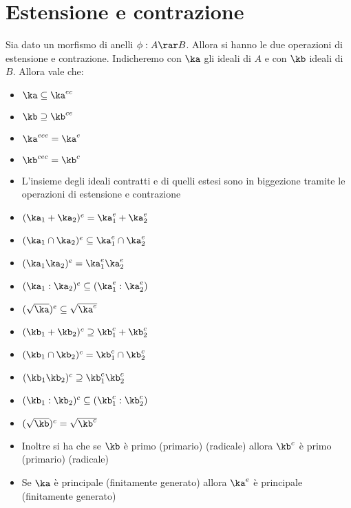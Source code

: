 \documentclass[a4paper,NoNotes,GeneralMath]{stdmdoc}
\begin{document}
	\section*{Estensione e contrazione}
	Sia dato un morfismo di anelli $\phi: A \rar B$. Allora si hanno le due operazioni di estensione e contrazione. Indicheremo con $\ka$ gli ideali di $A$ e con $\kb$ ideali di $B$. Allora vale che:
	\begin{itemize}
		\item $\ka \subseteq \ka^{ec}$
		\item $\kb \supseteq \kb^{ce}$
		\item $\ka^{ece} = \ka^e$
		\item $\kb^{cec} = \kb^c$
		\item L'insieme degli ideali contratti e di quelli estesi sono in biggezione tramite le operazioni di estensione e contrazione
		\item $(\ka_1 + \ka_2)^e = \ka_1^e + \ka_2^e$
		\item $(\ka_1 \cap \ka_2)^e \subseteq \ka_1^e \cap \ka_2^e$
		\item $(\ka_1 \ka_2)^e = \ka_1^e \ka_2^e$
		\item $(\ka_1 : \ka_2)^e \subseteq (\ka_1^e : \ka_2^e)$
		\item $(\sqrt{\ka})^e \subseteq \sqrt{\ka^e}$
		\item $(\kb_1 + \kb_2)^{c} \supseteq \kb_1^c + \kb_2^c$
		\item $(\kb_1 \cap \kb_2)^{c} = \kb_1^c \cap \kb_2^c$
		\item $(\kb_1 \kb_2)^{c} \supseteq \kb_1^c \kb_2^c$
		\item $(\kb_1 : \kb_2)^{c} \subseteq (\kb_1^c : \kb_2^c)$
		\item $(\sqrt{\kb})^c = \sqrt{\kb^c}$
		\item Inoltre si ha che se $\kb$ è primo (primario) (radicale) allora $\kb^c$ è primo (primario) (radicale)
		\item Se $\ka$ è principale (finitamente generato) allora $\ka^e$ è principale (finitamente generato)
	\end{itemize}
	
\end{document}
